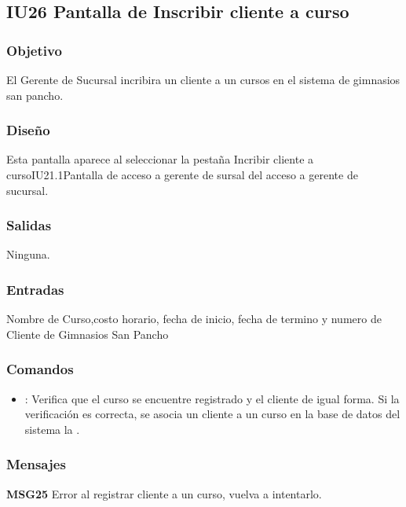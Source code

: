 \subsection{IU26 Pantalla de Inscribir cliente a curso}



\subsubsection{Objetivo}
	El Gerente de Sucursal incribira un cliente a un cursos en el sistema de gimnasios san pancho.

\subsubsection{Diseño}
Esta pantalla aparece al seleccionar la pestaña Incribir cliente a curso{IU21.1}{Pantalla de acceso a gerente de sursal} del acceso a gerente de sucursal. 


\subsubsection{Salidas}

	Ninguna.

\subsubsection{Entradas}
Nombre de Curso,costo horario, fecha de inicio, fecha de termino y numero de Cliente de Gimnasios San Pancho

\subsubsection{Comandos}
\begin{itemize}
	\item {}: Verifica que el curso se encuentre registrado y el cliente de igual forma. Si la verificación es correcta, se asocia un cliente a un curso en la base de datos del sistema la .
\end{itemize}

\subsubsection{Mensajes}
	\begin{Citemize}
		\item {\bf MSG25} Error al registrar cliente a un curso, vuelva a intentarlo.
	\end{Citemize}
